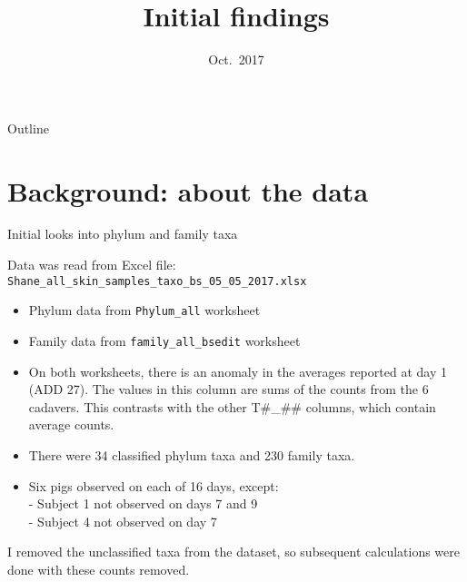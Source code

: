 \documentclass{beamer}
\title[]{Initial findings}
\date{Oct.\ 2017}
\begin{document}
\begin{frame}
  \titlepage
\end{frame}

\begin{frame}{Outline}
  \tableofcontents
\end{frame}








\section[Background]{Background: about the data}


\begin{frame}{Initial looks into phylum and family taxa}

  \noindent Data was read from Excel file:\\
  \texttt{Shane\_all\_skin\_samples\_taxo\_bs\_05\_05\_2017.xlsx}

  \begin{itemize}
    \item Phylum data from \texttt{Phylum\_all} worksheet
    \item Family data from \texttt{family\_all\_bsedit} worksheet
    \item On both worksheets, there is an anomaly in the averages
      reported at day 1 (ADD 27).  The values in this column are sums
      of the counts from the 6 cadavers.  This contrasts with the
      other T\#\_\#\# columns, which contain average counts.
    \item There were 34 classified phylum taxa and 230 family taxa.
    \item Six pigs observed on each of 16 days, except:\\
      - Subject 1 not observed on days 7 and 9\\
      - Subject 4 not observed on day 7
  \end{itemize}

\noindent I removed the unclassified taxa from the dataset, so
subsequent calculations were done with these counts removed.
  
\end{frame}
\end{document}
